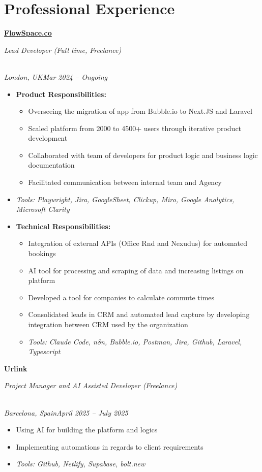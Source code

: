 \documentclass[a4paper,10pt]{article}
\newcommand{\role}[4]{\vspace{3pt}\noindent\hspace{0.6em}\parbox[t]{0.38\textwidth}{\raggedright\textbf{#1}}\hfill\parbox[t]{0.58\textwidth}{\raggedleft\textit{#2}}\\{\textit{#3}\hfill\textit{#4}}\vspace{1pt}}
\begin{document}
\section{Professional Experience}
\role{\href{https://flowspace.co}{FlowSpace.co}}{Lead Developer (Full time, Freelance)}{London, UK}{Mar 2024 -- Ongoing}
\begin{itemize}
\item \textbf{Product Responsibilities:}
\begin{itemize}[label=--]
\item Overseeing the migration of app from Bubble.io to Next.JS and Laravel
\item Scaled platform from 2000 to 4500+ users through iterative product development
\item Collaborated with team of developers for product logic and business logic documentation
\item Facilitated communication between internal team and Agency
\end{itemize}
\item \textit{Tools: Playwright, Jira, GoogleSheet, Clickup, Miro, Google Analytics, Microsoft Clarity}
\item \textbf{Technical Responsibilities:}
\begin{itemize}[label=--]
\item Integration of external APIs (Office Rnd and Nexudus) for automated bookings
\item AI tool for processing and scraping of data and increasing listings on platform
\item Developed a tool for companies to calculate commute times
\item Consolidated leads in CRM and automated lead capture by developing integration between CRM used by the organization
\item \textit{Tools: Claude Code, n8n, Bubble.io, Postman, Jira, Github, Laravel, Typescript}
\end{itemize}
\end{itemize}

\role{Urlink}{Project Manager and AI Assisted Developer (Freelance)}{Barcelona, Spain}{April 2025 -- July 2025}
\begin{itemize}
\item Using AI for building the platform and logics
\item Implementing automations in regards to client requirements
\item \textit{Tools: Github, Netlify, Supabase, bolt.new}
\end{itemize}
\end{document}
